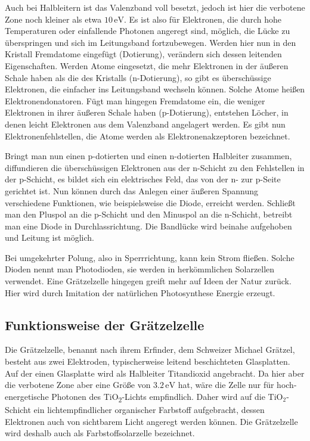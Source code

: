 \documentclass[11pt]{scrartcl}
\newcommand{\unit}[1]{\ensuremath{\,\mathrm{#1}}} %
\begin{document}
Auch bei Halbleitern ist das Valenzband voll besetzt, jedoch ist hier die verbotene Zone noch kleiner als etwa $10\unit{eV}$. Es ist also f\"ur Elektronen, die durch hohe Temperaturen oder einfallende Photonen angeregt sind, m\"oglich, die L\"ucke zu \"uberspringen und sich im Leitungsband fortzubewegen. Werden hier nun in den Kristall Fremdatome eingef\"ugt (Dotierung), ver\"andern sich dessen leitenden Eigenschaften. Werden Atome eingesetzt, die mehr Elektronen in der \"au\ss{}eren Schale haben als die des Kristalls (n-Dotierung), so gibt es \glqq\"ubersch\"ussige\grqq{} Elektronen, die einfacher ins Leitungsband wechseln k\"onnen. Solche Atome hei\ss{}en Elektronendonatoren. F\"ugt man hingegen Fremdatome ein, die weniger Elektronen in ihrer \"au\ss{}eren Schale haben (p-Dotierung), entstehen L\"ocher, in denen leicht Elektronen aus dem Valenzband angelagert werden. Es gibt nun Elektronenfehlstellen, die Atome werden als Elektronenakzeptoren bezeichnet.

Bringt man nun einen p-dotierten und einen n-dotierten Halbleiter zusammen, diffundieren die \"ubersch\"ussigen Elektronen aus der n-Schicht zu den Fehlstellen in der p-Schicht, es bildet sich ein elektrisches Feld, das von der n- zur p-Seite gerichtet ist. Nun k\"onnen durch das Anlegen einer \"au\ss{}eren Spannung verschiedene Funktionen, wie beispielsweise die Diode, erreicht werden. Schließt man den Pluspol an die p-Schicht und den Minuspol an die n-Schicht, betreibt man eine Diode in Durchlassrichtung. Die Bandl\"ucke wird beinahe aufgehoben und Leitung ist m\"oglich.

Bei umgekehrter Polung, also in Sperrrichtung, kann kein Strom flie\ss{}en. Solche Dioden nennt man Photodioden, sie werden in herk\"ommlichen Solarzellen verwendet. Eine Gr\"atzelzelle hingegen greift mehr auf Ideen der Natur zur\"uck. Hier wird durch Imitation der nat\"urlichen Photosynthese Energie erzeugt.



\subsection{Funktionsweise der Gr\"atzelzelle}
Die Gr\"atzelzelle, benannt nach ihrem Erfinder, dem Schweizer Michael Gr\"atzel, besteht aus zwei Elektroden, typischerweise leitend beschichteten Glasplatten. Auf der einen Glasplatte wird als Halbleiter Titandioxid angebracht. Da hier aber die verbotene Zone aber eine Gr\"o\ss{}e von $3.2\unit{eV}$ hat, w\"are die Zelle nur f\"ur hoch-energetische Photonen des TiO\textsubscript{2}-Lichts empfindlich. Daher wird auf die TiO$_{2}$-Schicht ein lichtempfindlicher organischer Farbstoff aufgebracht, dessen Elektronen auch von sichtbarem Licht angeregt werden k\"onnen. Die Gr\"atzelzelle wird deshalb auch als Farbstoffsolarzelle bezeichnet.
\end{document}
